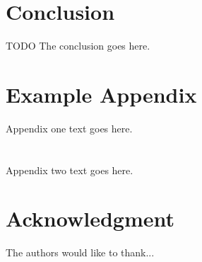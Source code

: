\documentclass[journal]{IEEEtran}
\begin{document}
\section{Conclusion}
\label{sec:conclusion}
TODO The conclusion goes here.






%


\appendices
\section{Example Appendix}
Appendix one text goes here.

\section{}
Appendix two text goes here.


\section*{Acknowledgment}


The authors would like to thank...
\end{document}
